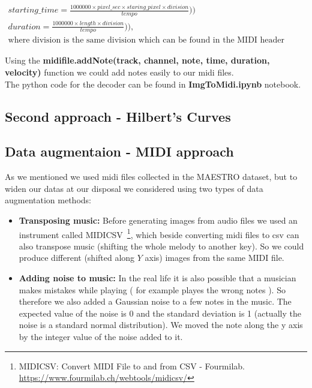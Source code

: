 \documentclass{article}
\begin{document}
		\begin{gather}
		starting\_time = \frac{1000000 \times pixel\_sec \times staring\_pixel \times division}{tempo})) \\
		duration = \frac{1000000 \times length \times division}{tempo})), \\
		\text{where division is the same division which can be found in the MIDI header message} \nonumber
		\end{gather}
	
	Using the  \textbf{midifile.addNote(track, channel, note, time, duration, velocity)} function we could add notes easily to our midi files. \\ 
	
	The python code for the decoder can be found in \textbf{ImgToMidi.ipynb} notebook.
	
\subsection{Second approach - Hilbert's Curves}



\subsection{Data augmentaion - MIDI approach}

As we mentioned we used midi files collected in the MAESTRO dataset, but to widen our datas at our disposal we considered using two types of data augmentation methods: 
\begin{itemize}
	\item \textbf{Transposing music: } Before generating images from audio files we used an instrument called MIDICSV~\footnote{MIDICSV: Convert MIDI File to and from CSV - Fourmilab. \url{https://www.fourmilab.ch/webtools/midicsv/}}, which beside converting midi files to csv can also transpose music (shifting the whole melody to another key). So we could produce different (shifted along $Y$ axis) images from the same MIDI file.
	
	\item \textbf{Adding noise to music: } In the real life it is also possible that a musician makes mistakes while playing ( for example playes the wrong notes ). So therefore we also added a Gaussian noise to a few notes in the music. The expected value of the noise is 0 and the standard deviation is 1 (actually the noise is a standard normal distribution). We moved the note along the y axis by the integer value of the noise added to it.
\end{itemize}
\end{document}
